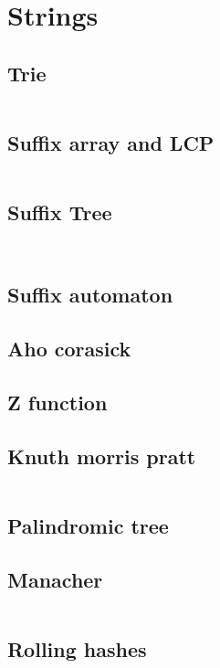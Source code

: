 \section{Strings}
    \subsection{Trie}
    \inputminted[tabsize=2,breaklines,firstline=3,lastline=78,fontsize=\small]{c++}{Strings/Trie.cpp}
    
    \subsection{Suffix array and LCP}
    \inputminted[tabsize=2,breaklines,firstline=6,lastline=77,fontsize=\small]{c++}{Strings/Suffix_array.cpp}
    
    \subsection{Suffix Tree}
    \inputminted[tabsize=2,breaklines,firstline=3,lastline=65,fontsize=\small]{c++}{Strings/Suffix_tree.cpp}
    \inputminted[tabsize=2,breaklines,firstline=88,lastline=110,fontsize=\small]{c++}{Strings/Suffix_tree.cpp}

    \subsection{Suffix automaton}

    \subsection{Aho corasick}

    \subsection{Z function}

    \subsection{Knuth morris pratt}
    \inputminted[tabsize=2,breaklines,firstline=3,lastline=16,fontsize=\small]{c++}{Strings/KMP.cpp}

    \subsection{Palindromic tree}

    \subsection{Manacher}
    \inputminted[tabsize=2,breaklines,firstline=2,lastline=18,fontsize=\small]{c++}{Strings/manacher.cpp}
    
    \subsection{Rolling hashes}
    \inputminted[tabsize=2,breaklines,firstline=4,lastline=141,fontsize=\small]{c++}{Strings/Rolling_hashes.cpp}

